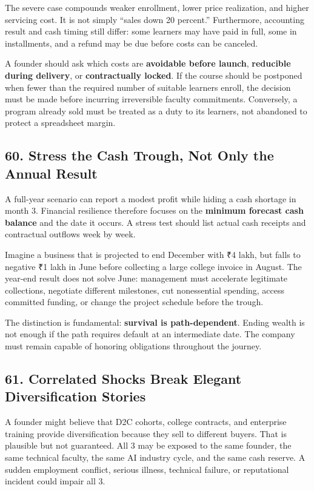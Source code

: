 The severe case compounds weaker enrollment, lower price realization, and higher servicing cost. It is not simply ``sales down 20 percent.'' Furthermore, accounting result and cash timing still differ: some learners may have paid in full, some in installments, and a refund may be due before costs can be canceled.

A founder should ask which costs are \textbf{avoidable before launch}, \textbf{reducible during delivery}, or \textbf{contractually locked}. If the course should be postponed when fewer than the required number of suitable learners enroll, the decision must be made before incurring irreversible faculty commitments. Conversely, a program already sold must be treated as a duty to its learners, not abandoned to protect a spreadsheet margin.

\subsection*{60. Stress the Cash Trough, Not Only the Annual Result}

A full-year scenario can report a modest profit while hiding a cash shortage in month 3. Financial resilience therefore focuses on the \textbf{minimum forecast cash balance} and the date it occurs. A stress test should list actual cash receipts and contractual outflows week by week.

Imagine a business that is projected to end December with ₹4 lakh, but falls to negative ₹1 lakh in June before collecting a large college invoice in August. The year-end result does not solve June: management must accelerate legitimate collections, negotiate different milestones, cut nonessential spending, access committed funding, or change the project schedule before the trough.

The distinction is fundamental: \textbf{survival is path-dependent}. Ending wealth is not enough if the path requires default at an intermediate date. The company must remain capable of honoring obligations throughout the journey.

\subsection*{61. Correlated Shocks Break Elegant Diversification Stories}

A founder might believe that D2C cohorts, college contracts, and enterprise training provide diversification because they sell to different buyers. That is plausible but not guaranteed. All 3 may be exposed to the same founder, the same technical faculty, the same AI industry cycle, and the same cash reserve. A sudden employment conflict, serious illness, technical failure, or reputational incident could impair all 3.

